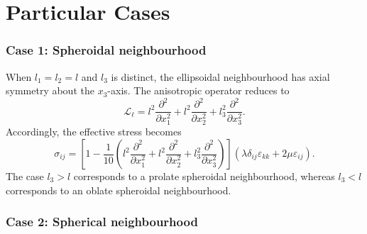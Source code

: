 \documentclass[final,3p,times,fleqn]{elsarticle}
\begin{document}
\section{Particular Cases}

\subsubsection*{Case 1: Spheroidal neighbourhood}

When $l_1=l_2=l$ and $l_3$ is distinct, the ellipsoidal neighbourhood
has axial symmetry about the $x_3$-axis. The anisotropic operator reduces
to
\begin{equation}\label{eq:spheroidal_operator}
\mathcal{L}_{\ell}
=
l^2\frac{\partial^2}{\partial x_1^2}
+
l^2\frac{\partial^2}{\partial x_2^2}
+
l_3^2\frac{\partial^2}{\partial x_3^2}.
\end{equation}
Accordingly, the effective stress becomes
\begin{equation}\label{eq:spheroidal}
\sigma_{ij}
=
\left[
1
-
\frac{1}{10}
\left(
l^2\frac{\partial^2}{\partial x_1^2}
+
l^2\frac{\partial^2}{\partial x_2^2}
+
l_3^2\frac{\partial^2}{\partial x_3^2}
\right)
\right]
\left(
\lambda\delta_{ij}\varepsilon_{kk}
+
2\mu\varepsilon_{ij}
\right).
\end{equation}
The case $l_3>l$ corresponds to a prolate spheroidal neighbourhood,
whereas $l_3<l$ corresponds to an oblate spheroidal neighbourhood.

\subsubsection*{Case 2: Spherical neighbourhood}
\end{document}
